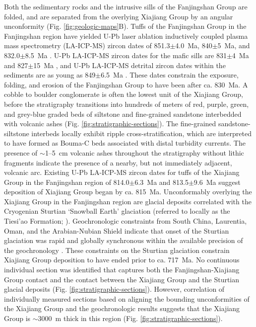 Both the sedimentary rocks and the intrusive sills of the Fanjingshan Group are folded, and are separated from the overlying Xiajiang Group by an angular unconformity (Fig. \ref{fig:geologic-maps}B). Tuffs of the Fanjingshan Group in the Fanjingshan region have yielded U-Pb laser ablation inductively coupled plasma mass spectrometry (LA-ICP-MS) zircon dates of 851.3$\pm$4.0~Ma, 840$\pm$5~Ma, and 832.0$\pm$8.5~Ma \citep{Wang2012d, Gao2014a}. U-Pb LA-ICP-MS zircon dates for the mafic sills are 831$\pm$4~Ma and 827$\pm$15~Ma \citep{Zhao2011a}, and U-Pb LA-ICP-MS detrital zircon dates within the sediments are as young as 849$\pm$6.5~Ma \citep{Zhao2011a}. These dates constrain the exposure, folding, and erosion of the Fanjingshan Group to have been after ca. 830~Ma. A cobble to boulder conglomerate is often the lowest unit of the Xiajiang Group, before the stratigraphy transitions into hundreds of meters of red, purple, green, and grey-blue graded beds of siltstone and fine-grained sandstone interbedded with volcanic ashes (Fig. \ref{fig:stratigraphic-sections}). The fine-grained sandstone-siltstone interbeds locally exhibit ripple cross-stratification, which are interpreted to have formed as Bouma-C beds associated with distal turbidity currents. The presence of $\sim$1--5~cm volcanic ashes throughout the stratigraphy without lithic fragments indicate the presence of a nearby, but not immediately adjacent, volcanic arc. Existing U-Pb LA-ICP-MS zircon dates for tuffs of the Xiajiang Group in the Fanjingshan region of 814.0$\pm$6.3~Ma and 813.5$\pm$9.6~Ma \citep{Gao2010a, Gao2014a} suggest deposition of Xiajiang Group began by ca. 815~Ma. Unconformably overlying the Xiajiang Group in the Fanjingshan region are glacial deposits correlated with the Cryogenian Sturtian `Snowball Earth' glaciation (referred to locally as the Tiesi'ao Formation; \citealp{Xiong2014a}). Geochronologic constraints from South China, Laurentia, Oman, and the Arabian-Nubian Shield indicate that onset of the Sturtian glaciation was rapid and globally synchronous within the available precision of the geochronology \citep{Bowring2007a, Macdonald2010a, MacLennan2018a, Lan2020a}. These constraints on the Sturtian glaciation constrain Xiajiang Group deposition to have ended prior to ca. 717~Ma. No continuous individual section was identified that captures both the Fanjingshan-Xiajiang Group contact and the contact between the Xiajiang Group and the Sturtian glacial deposits (Fig. \ref{fig:stratigraphic-sections}). However, correlation of individually measured sections based on aligning the bounding unconformities of the Xiajiang Group and the geochronologic results suggests that the Xiajiang Group is $\sim$3000~m thick in this region (Fig. \ref{fig:stratigraphic-sections}).

